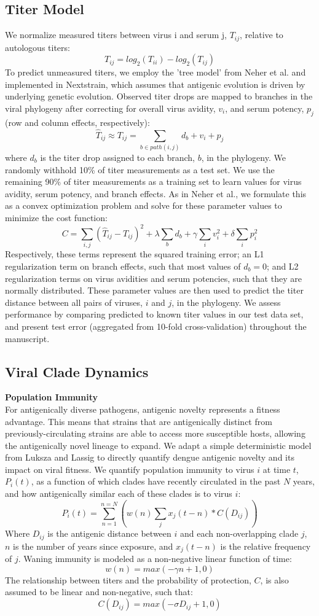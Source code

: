 \documentclass[11pt,oneside,letterpaper]{article}
\begin{document}
\subsection*{Titer Model}
We normalize measured titers between virus i and serum j, $T_{ij}$, relative to autologous titers: $$T_{ij} = log_2(T_{ii}) - log_2(T_{ij})$$
To predict unmeasured titers, we employ the 'tree model' from Neher et al. and implemented in Nextstrain, which assumes that antigenic evolution is driven by underlying genetic evolution.
Observed titer drops are mapped to branches in the viral phylogeny after correcting for overall virus avidity, $v_i$, and serum potency, $p_j$ (row and column effects, respectively):
$$\hat{T}_{ij} \approx T_{ij} = \sum_{b \in path(i,j)} d_b + v_i + p_j$$
where $d_b$ is the titer drop assigned to each branch, $b$, in the phylogeny.
We randomly withhold 10\% of titer measurements as a test set.
We use the remaining 90\% of titer measurements as a training set to learn values for virus avidity, serum potency, and branch effects.
As in Neher et al., we formulate this as a convex optimization problem and solve for these parameter values to minimize the cost function:
$$C = \sum_{i,j} (\hat{T}_{ij} - T_{ij})^2 + \lambda \sum_{b} d_b + \gamma \sum_{i} v_i^2 + \delta \sum_{i} p_i^2$$
Respectively, these terms represent the squared training error; an L1 regularization term on branch effects, such that most values of $d_b = 0$; and L2 regularization terms on virus avidities and serum potencies, such that they are normally distributed.
These parameter values are then used to predict the titer distance between all pairs of viruses, $i$ and $j$, in the phylogeny.
We assess performance by comparing predicted to known titer values in our test data set, and present test error (aggregated from 10-fold cross-validation) throughout the manuscript.

\subsection*{Viral Clade Dynamics}
\textbf{Population Immunity}\\
For antigenically diverse pathogens, antigenic novelty represents a fitness advantage.
This means that strains that are antigenically distinct from previously-circulating strains are able to access more susceptible hosts, allowing the antigenically novel lineage to expand.
We adapt a simple deterministic model from Luksza and Lassig to directly quantify dengue antigenic novelty and its impact on viral fitness.
We quantify population immunity to virus $i$ at time $t$, $P_i(t)$, as a function of which clades have recently circulated in the past $N$ years, and how antigenically similar each of these clades is to virus $i$:
$$P_i(t) = \sum_{n=1}^{n=N} (w(n)  \sum_{j} x_j(t-n) * C( D_{ij}))$$
Where $D_{ij}$ is the antigenic distance between $i$ and each non-overlapping clade $j$, $n$ is the number of years since exposure, and $x_j(t-n)$ is the relative frequency of $j$.
Waning immunity is modeled as a non-negative linear function of time:
$$w(n) = max(-\gamma n + 1, 0)$$
The relationship between titers and the probability of protection, $C$, is also assumed to be linear and non-negative, such that:
$$C(D_{ij}) = max(-\sigma D_{ij} + 1, 0)$$
\end{document}
